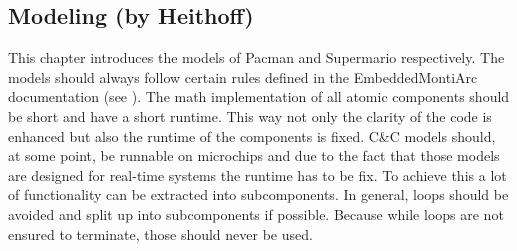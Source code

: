 

\subsection{Modeling (by Heithoff)}

This chapter introduces the models of Pacman and Supermario respectively.
The models should always follow certain rules defined in the EmbeddedMontiArc documentation (see \cite{emadoc}). The math implementation of all atomic components should be short and have a short runtime. This way not only the clarity of the code is enhanced but also the runtime of the components is fixed. C\&C models should, at some point, be runnable on microchips and due to the fact that those models are designed for real-time systems the runtime has to be fix.
To achieve this a lot of functionality can be extracted into subcomponents. In general, loops should be avoided and split up into subcomponents if possible. Because while loops are not ensured to terminate, those should never be used.




